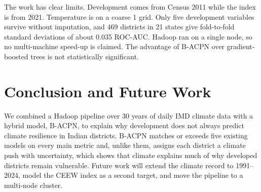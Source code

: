 \documentclass[conference]{IEEEtran}
\begin{document}
The work has clear limits. Development comes from Census 2011 while the index is from 2021. Temperature is on a coarse 1\textdegree{} grid. Only five development variables survive without imputation, and 469 districts in 21 states give fold-to-fold standard deviations of about 0.035 ROC-AUC. Hadoop ran on a single node, so no multi-machine speed-up is claimed. The advantage of B-ACPN over gradient-boosted trees is not statistically significant.

\section{Conclusion and Future Work}
We combined a Hadoop pipeline over 30 years of daily IMD climate data with a hybrid model, B-ACPN, to explain why development does not always predict climate resilience in Indian districts. B-ACPN matches or exceeds five existing models on every main metric and, unlike them, assigns each district a climate push with uncertainty, which shows that climate explains much of why developed districts remain vulnerable. Future work will extend the climate record to 1991--2024, model the CEEW index as a second target, and move the pipeline to a multi-node cluster.
\end{document}
